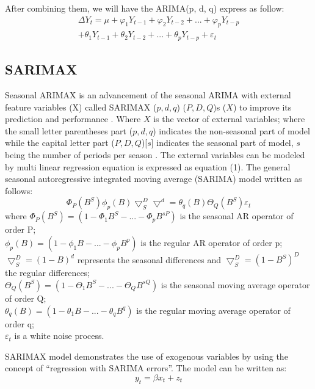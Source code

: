 \documentclass{ieeeojies}
\begin{document}
After combining them, we will have the ARIMA(p, d, q) express as follow:
\begin{equation}
\begin{aligned}
\Delta Y_t = \mu + \varphi_1Y_{t-1} + \varphi_2Y_{t-2} + ... +\varphi_pY_{t-p} \\
+ \theta_1Y_{t-1} + \theta_2Y_{t-2} + ... + \theta_pY_{t-p} + \varepsilon_t
\end{aligned}
\end{equation}

\subsection{SARIMAX}
Seasonal ARIMAX is an advancement of the seasonal ARIMA with external feature variables (X) called SARIMAX ($p, d, q$) ($P,D,Q$)s ($X$) to improve its prediction and performance \cite{b9}. Where $X$ is the vector of external variables; where the small letter parentheses part ($p,d,q$) indicates the non-seasonal part of model while the capital letter part ($P,D,Q$)[$s$] indicates the seasonal part of model, $s$ being the number of periods per season \cite{b4}. The external variables can be modeled by multi linear regression equation is expressed as equation (1). The general seasonal autoregressive integrated moving average (SARIMA) model written as follows:
\begin{equation}
    \Phi_P(B^S)\phi_p(B)\bigtriangledown_S^D\bigtriangledown^d = \theta_q(B)\Theta_Q(B^S)\varepsilon_t
\end{equation}
where $\Phi_P(B^S) = (1 - \Phi_1B^S - ... - \Phi_pB^{sP})$ is the seasonal AR operator of order P;\\
$\phi_p(B) = (1 - \phi_1B - ... - \phi_pB^p)$ is the regular AR operator of order p; $\bigtriangledown_S^D = (1 - B)^d$ represents the seasonal differences and $\bigtriangledown_S^D = (1 - B^S)^D$ the regular differences;\\
$\Theta_Q(B^S) = (1 - \Theta_1B^S - ... - \Theta_QB^{sQ})$ is the seasonal moving average operator of order Q; \\
$\theta_q(B) = (1 - \theta_1B - ... - \theta_qB^q) $ is the regular moving average operator of order q;\\
$\varepsilon_t$ is a white noise process.

SARIMAX model demonstrates the use of exogenous variables by using the concept of “regression with SARIMA errors”. The model can be written as:
\begin{equation}
    y_t = \beta x_t + z_t
\end{equation}
\end{document}
